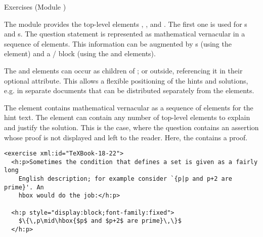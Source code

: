 \begin{module}[id=quiz]
\begin{omgroup}[id=quiz,short=Exercises]{Exercises (Module {})}
\begin{definition}[id=exercise.def]
  The {} module provides the top-level elements {},
  , and . The first one is used for
  {s} and {s}. The question statement is
  represented as mathematical vernacular in a sequence of 
  elements. This information can be augmented by {s}
  (using the  element) and a {}/{}
  block (using the  and  elements).
\end{definition}

The  and  elements can occur as children of
; or outside, referencing it in their optional
 attribute. This allows a flexible positioning of the hints and
solutions, e.g. in separate documents that can be distributed separately from the
 elements. 

\begin{definition}[id=hint.def]
  The {} element contains mathematical vernacular as a sequence of
   elements for the hint text. The {} element can contain any
  number of \omdoc top-level elements to explain and justify the solution.  This is the
  case, where the question contains an assertion whose proof is not displayed and left to
  the reader. Here, the  contains a proof.
\end{definition}

\begin{lstlisting}[label=lst:texbook-exercise,escapechar=\%,
  caption={An Exercise from the {\TeX}Book},
  index={exercise,hint,solution}]
<exercise xml:id="TeXBook-18-22">
  <h:p>Sometimes the condition that defines a set is given as a fairly long
    English description; for example consider `{p|p and p+2 are prime}'. An 
    hbox would do the job:</h:p>

  <h:p style="display:block;font-family:fixed">
    $\{\,p\mid\hbox{$p$ and $p+2$ are prime}\,\}$
  </h:p>


\end{lstlisting}
\end{omgroup}
\end{module}
